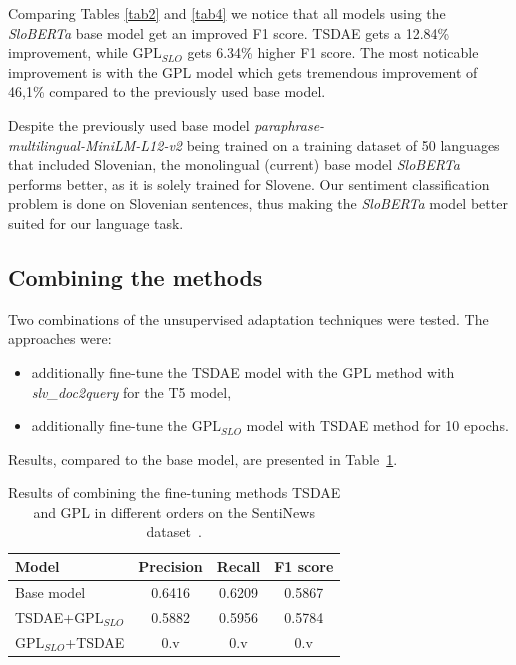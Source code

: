 \documentclass[fleqn,moreauthors,10pt]{ds_report}
\begin{document}
Comparing Tables \ref*{tab2} and \ref*{tab4} we notice that all models using the {\it SloBERTa} base model get an improved F1 score. TSDAE gets a 12.84\% improvement, while $\text{GPL}_{SLO}$ gets 6.34\% higher F1 score. The most noticable improvement is with the GPL model which gets tremendous improvement of 46,1\% compared to the previously used base model.

Despite the previously used base model {\it paraphrase-\\multilingual-MiniLM-L12-v2} being trained on a training dataset of 50 languages that included Slovenian, the monolingual (current) base model {\it SloBERTa} performs better, as it is solely trained for Slovene. Our sentiment classification problem is done on Slovenian sentences, thus making the {\it SloBERTa} model better suited for our language task.


\subsection*{Combining the methods}
Two combinations of the unsupervised adaptation techniques were tested. The approaches were:
\begin{itemize}
	\item additionally fine-tune the TSDAE model with the GPL method with {\it slv\_doc2query} for the T5 model,
	\item additionally fine-tune the $\text{GPL}_{SLO}$ model with TSDAE method for 10 epochs.
\end{itemize}
Results, compared to the base model, are presented in Table~\ref{tab5}.

\begin{table}[!h]
	\footnotesize
	\begin{center}
		\begin{tabular}{ |l|c|c|c| }
		\hline
		\rowcolor{Blue}Model & Precision & Recall & F1 score\\
		\hline

		Base model & 0.6416 & 0.6209 & 0.5867\\
		TSDAE+$\text{GPL}_{SLO}$ & 0.5882 & 0.5956 & 0.5784\\
		$\text{GPL}_{SLO}$+TSDAE & 0.v & 0.v & 0.v\\

		\hline
		\end{tabular}
	\end{center}
\caption{Results of combining the fine-tuning methods TSDAE and GPL in different orders on the SentiNews dataset~\cite{sentiNews}.}
\label{tab5}
\end{table}
\end{document}
